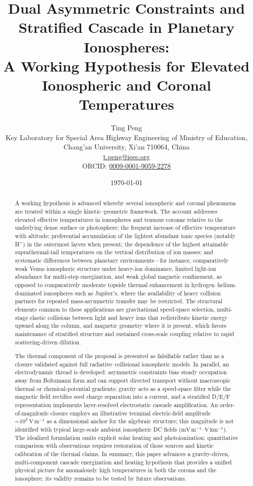 \documentclass[11pt,a4paper]{article}
\title{Dual Asymmetric Constraints and Stratified Cascade in Planetary Ionospheres:\\
A Working Hypothesis for Elevated Ionospheric and Coronal Temperatures}
\author{Ting Peng\\
Key Laboratory for Special Area Highway Engineering of Ministry of Education,\\
Chang'an University, Xi'an 710064, China\\
\url{t.peng@ieee.org}\\
ORCID: \href{https://orcid.org/0009-0001-9059-2278}{0009-0001-9059-2278}
}
\date{\today}
\begin{document}
\maketitle

\begin{abstract}\raggedright\sloppy
A working hypothesis is advanced whereby several ionospheric and coronal phenomena are treated within a single kinetic--geometric framework. The account addresses elevated effective temperatures in ionospheres and tenuous coronae relative to the underlying dense surface or photosphere; the frequent increase of effective temperature with altitude; preferential accumulation of the lightest abundant ionic species (notably H$^+$) in the outermost layers when present; the dependence of the highest attainable suprathermal-tail temperatures on the vertical distribution of ion masses; and systematic differences between planetary environments---for instance, comparatively weak Venus ionospheric structure under heavy-ion dominance, limited light-ion abundance for multi-step energization, and weak global magnetic confinement, as opposed to comparatively moderate topside thermal enhancement in hydrogen--helium-dominated ionospheres such as Jupiter's, where the availability of heavy collision partners for repeated mass-asymmetric transfer may be restricted. The structural elements common to these applications are gravitational speed-space selection, multi-stage elastic collisions between light and heavy ions that redistribute kinetic energy upward along the column, and magnetic geometry where it is present, which favors maintenance of stratified structure and sustained cross-scale coupling relative to rapid scattering-driven dilution.

The thermal component of the proposal is presented as falsifiable rather than as a closure validated against full radiative--collisional ionospheric models. In parallel, an electrodynamic thread is developed: asymmetric constraints bias steady occupation away from Boltzmann form and can support directed transport without macroscopic thermal or chemical-potential gradients; gravity acts as a speed-space filter while the magnetic field rectifies seed charge separation into a current, and a stratified D/E/F representation implements layer-resolved electrostatic cascade amplification. An order-of-magnitude closure employs an illustrative terminal electric-field amplitude $\sim 10^2\ \mathrm{V\,m^{-1}}$ as a dimensional anchor for the algebraic structure; this magnitude is not identified with typical large-scale ambient ionospheric DC fields ($\mathrm{mV\,m^{-1}}$--$\mathrm{V\,km^{-1}}$). The idealized formulation omits explicit solar heating and photoionization; quantitative comparison with observations requires restoration of those sources and kinetic calibration of the thermal claims. In summary, this paper advances a gravity-driven, multi-component cascade energization and heating hypothesis that provides a unified physical picture for anomalously high temperatures in both the corona and the ionosphere; its validity remains to be tested by future observations.
\end{abstract}
\end{document}
